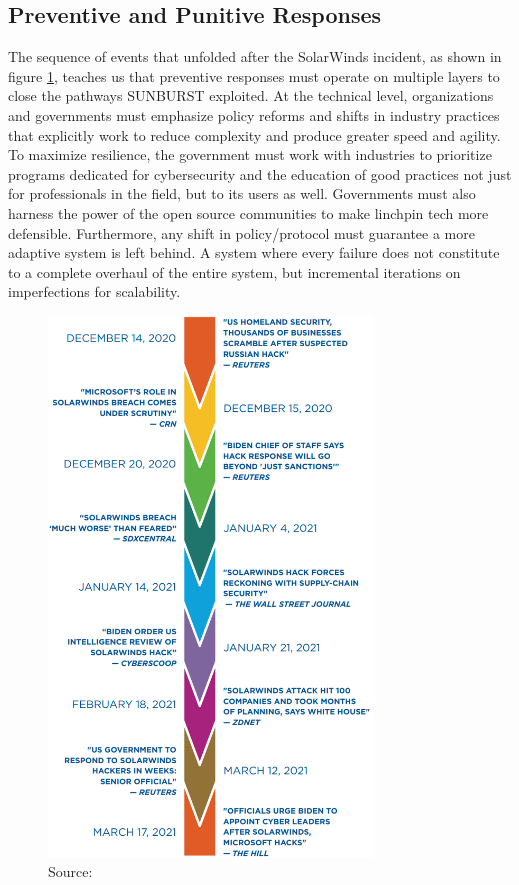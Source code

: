 \documentclass[conference]{IEEEtran}
\begin{document}
\subsection{Preventive and Punitive Responses}
    The sequence of events that unfolded after the SolarWinds incident, as shown in figure \ref{fig:AfterMathTimeLine}, teaches us that preventive responses must operate on
    multiple layers to close the pathways SUNBURST exploited. At the technical level, organizations and governments
    must emphasize policy reforms and shifts in industry practices that explicitly work to reduce complexity and produce greater speed and agility. To
    maximize resilience, the government must work with industries to prioritize programs dedicated for cybersecurity and the education of good practices
    not just for professionals in the field, but to its users as well. Governments must also harness the power of the open source communities to 
    make linchpin tech more defensible. Furthermore, any shift in policy/protocol must guarantee a more adaptive system is left behind. A system where 
    every failure does not constitute to a complete overhaul of the entire system, but incremental iterations on imperfections for scalability.
    \begin{figure}[H]
        \centering
        \includegraphics[width=3.4in]{AfterMath-Timeline.png}
        \caption{Source: \cite{BrokenTrustHerrEtAl} }
        \label{fig:AfterMathTimeLine}
    \end{figure}
\end{document}
